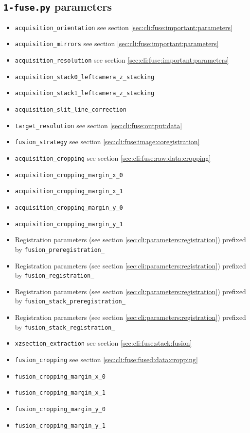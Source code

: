 \subsection{\texttt{1-fuse.py} parameters}
\label{sec:cli:parameters:fuse}



\begin{itemize}
\itemsep -0.5ex
\item \texttt{acquisition\_orientation}
  see section \ref{sec:cli:fuse:important:parameters}
\item \texttt{acquisition\_mirrors}
  see section \ref{sec:cli:fuse:important:parameters}
\item \texttt{acquisition\_resolution}
  see section \ref{sec:cli:fuse:important:parameters}
\item \texttt{acquisition\_stack0\_leftcamera\_z\_stacking}
\item \texttt{acquisition\_stack1\_leftcamera\_z\_stacking}
\item \texttt{acquisition\_slit\_line\_correction}
\item \texttt{target\_resolution}
  see section \ref{sec:cli:fuse:output:data}
\item \texttt{fusion\_strategy}
  see section \ref{sec:cli:fuse:image:coregistration}
\item \texttt{acquisition\_cropping}
  see section \ref{sec:cli:fuse:raw:data:cropping}
\item \texttt{acquisition\_cropping\_margin\_x\_0}
\item \texttt{acquisition\_cropping\_margin\_x\_1}
\item \texttt{acquisition\_cropping\_margin\_y\_0}
\item \texttt{acquisition\_cropping\_margin\_y\_1}
\item Registration parameters 
  (see section \ref{sec:cli:parameters:registration}) prefixed 
  by \texttt{fusion\_preregistration\_}
\item Registration parameters 
  (see section \ref{sec:cli:parameters:registration}) prefixed 
  by \texttt{fusion\_registration\_}
\item Registration parameters 
  (see section \ref{sec:cli:parameters:registration}) prefixed 
  by \texttt{fusion\_stack\_preregistration\_}
\item Registration parameters 
  (see section \ref{sec:cli:parameters:registration}) prefixed 
  by \texttt{fusion\_stack\_registration\_}
\item \texttt{xzsection\_extraction}
  see section \ref{sec:cli:fuse:stack:fusion}
\item \texttt{fusion\_cropping}
  see section \ref{sec:cli:fuse:fused:data:cropping}
\item \texttt{fusion\_cropping\_margin\_x\_0}
\item \texttt{fusion\_cropping\_margin\_x\_1}
\item \texttt{fusion\_cropping\_margin\_y\_0}
\item \texttt{fusion\_cropping\_margin\_y\_1}


\end{itemize}
